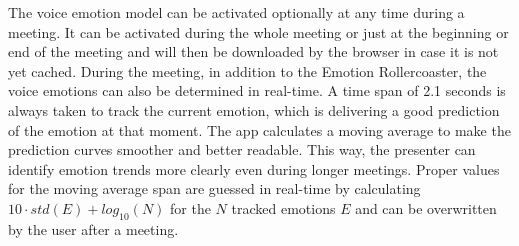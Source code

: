The voice emotion model can be activated optionally at any time during a meeting. It can be activated during the whole meeting or just at the beginning or end of the meeting and will then be downloaded by the browser in case it is not yet cached. During the meeting, in addition to the Emotion Rollercoaster, the voice emotions can also be determined in real-time. A time span of 2.1 seconds is always taken to track the current emotion, which is delivering a good prediction of the emotion at that moment. The app calculates a moving average to make the prediction curves smoother and better readable. This way, the presenter can identify emotion trends more clearly even during longer meetings. Proper values for the moving average span are guessed in real-time by calculating $10 \cdot std(E) + log_{10}(N)$ for the $N$ tracked emotions $E$ and can be overwritten by the user after a meeting.

